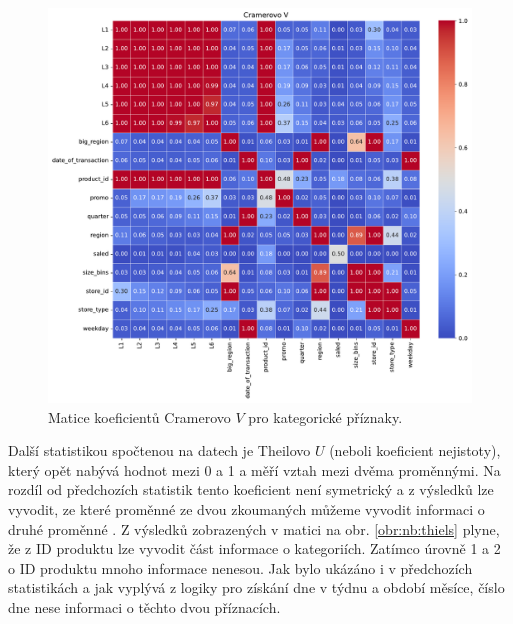\begin{figure}[h!]
    \centering
    \includegraphics[width=\textwidth]{obrazky/pripravadat/correlation_matrix_cramers-everything-SFF-stores_targets002.pdf}
    \caption{Matice koeficientů Cramerovo $V$ pro kategorické příznaky.}
    \label{obr:nb:cramers}
\end{figure}

Další statistikou spočtenou na datech je Theilovo $U$ (neboli koeficient nejistoty), který opět nabývá hodnot mezi 0 a 1 a měří vztah mezi dvěma proměnnými. Na rozdíl od předchozích statistik tento koeficient není symetrický a z výsledků lze vyvodit, ze které proměnné ze dvou zkoumaných můžeme vyvodit informaci o druhé proměnné \cite{bib:correl}. Z výsledků zobrazených v matici na obr. \ref*{obr:nb:thiels} plyne, že z ID produktu lze vyvodit část informace o kategoriích. Zatímco úrovně 1 a 2 o ID produktu mnoho informace nenesou. Jak bylo ukázáno i v předchozích statistikách a jak vyplývá z logiky pro získání dne v týdnu a období měsíce, číslo dne nese informaci o těchto dvou příznacích.

